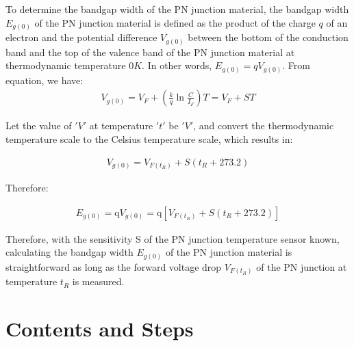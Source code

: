 \documentclass[UTF8]{article}
\begin{document}
   To determine the bandgap width of the PN junction material, the bandgap width $E_{g(0)}$ of the PN junction material is defined as the product of the charge $q$ of an electron and the potential difference $V_{g(0)}$ between the bottom of the conduction band and the top of the valence band of the PN junction material at thermodynamic temperature $0K$. In other words, $E_{g(0)} = qV_{g(0)}$. From equation, we have:
   	\begin{eqnarray}
   	V_{g(0)}=V_{F}+\left(\frac{k}{q} \ln \frac{C}{I_{F}}\right) T=V_{F}+S T
   	\end{eqnarray}
   	
   	Let the value of $'V'$ at temperature $'t'$ be $'V'$, and convert the thermodynamic temperature scale to the Celsius temperature scale, which results in:
   	
   	\begin{eqnarray}
   	V_{g(0)}=V_{F\left(t_{R}\right)}+S\left(t_{R}+273.2\right)
   	\end{eqnarray}
   	
   	Therefore:
   	
   	\begin{eqnarray}
   	E_{g(0)}=\mathrm{q} V_{g(0)}=\mathrm{q}\left[V_{F\left(t_{R}\right)}+S\left(t_{R}+273.2\right)\right]
   	\end{eqnarray}
   	
   	Therefore, with the sensitivity S of the PN junction temperature sensor known, calculating the bandgap width $E_{g(0)}$ of the PN junction material is straightforward as long as the forward voltage drop $V_{F(t_R)}$ of the PN junction at temperature $t_R$ is measured.
   
   
	\section{Contents and Steps}
\end{document}

